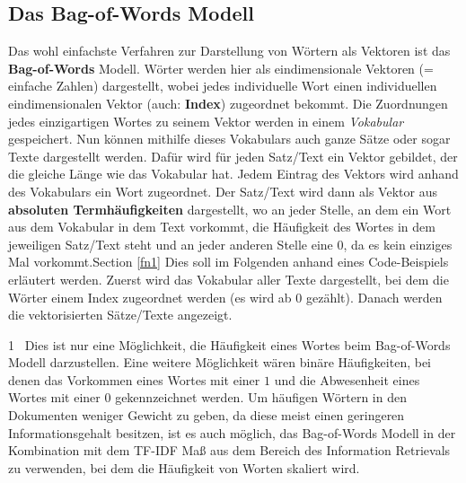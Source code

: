 \documentclass[11pt]{article}
\begin{document}
    \hypertarget{das-bag-of-words-modell}{%
\subsection{Das Bag-of-Words Modell}\label{das-bag-of-words-modell}}

Das wohl einfachste Verfahren zur Darstellung von Wörtern als Vektoren
ist das \textbf{Bag-of-Words} Modell. Wörter werden hier als
eindimensionale Vektoren (= einfache Zahlen) dargestellt, wobei jedes
individuelle Wort einen individuellen eindimensionalen Vektor (auch:
\textbf{Index}) zugeordnet bekommt. Die Zuordnungen jedes einzigartigen
Wortes zu seinem Vektor werden in einem \emph{Vokabular} gespeichert.
Nun können mithilfe dieses Vokabulars auch ganze Sätze oder sogar Texte
dargestellt werden. Dafür wird für jeden Satz/Text ein Vektor gebildet,
der die gleiche Länge wie das Vokabular hat. Jedem Eintrag des Vektors
wird anhand des Vokabulars ein Wort zugeordnet. Der Satz/Text wird dann
als Vektor aus \textbf{absoluten Termhäufigkeiten} dargestellt, wo an
jeder Stelle, an dem ein Wort aus dem Vokabular in dem Text vorkommt,
die Häufigkeit des Wortes in dem jeweiligen Satz/Text steht und an jeder
anderen Stelle eine \(0\), da es kein einziges Mal
vorkommt.Section \ref{fn1} Dies soll im Folgenden anhand eines
Code-Beispiels erläutert werden. Zuerst wird das Vokabular aller Texte
dargestellt, bei dem die Wörter einem Index zugeordnet werden (es wird
ab \(0\) gezählt). Danach werden die vektorisierten Sätze/Texte
angezeigt.

\hypertarget{fn1}{}
1 ~Dies ist nur eine Möglichkeit, die Häufigkeit eines Wortes beim
Bag-of-Words Modell darzustellen. Eine weitere Möglichkeit wären binäre
Häufigkeiten, bei denen das Vorkommen eines Wortes mit einer \(1\) und
die Abwesenheit eines Wortes mit einer \(0\) gekennzeichnet werden. Um
häufigen Wörtern in den Dokumenten weniger Gewicht zu geben, da diese
meist einen geringeren Informationsgehalt besitzen, ist es auch möglich,
das Bag-of-Words Modell in der Kombination mit dem TF-IDF Maß aus dem
Bereich des Information Retrievals zu verwenden, bei dem die Häufigkeit
von Worten skaliert wird.
\end{document}
